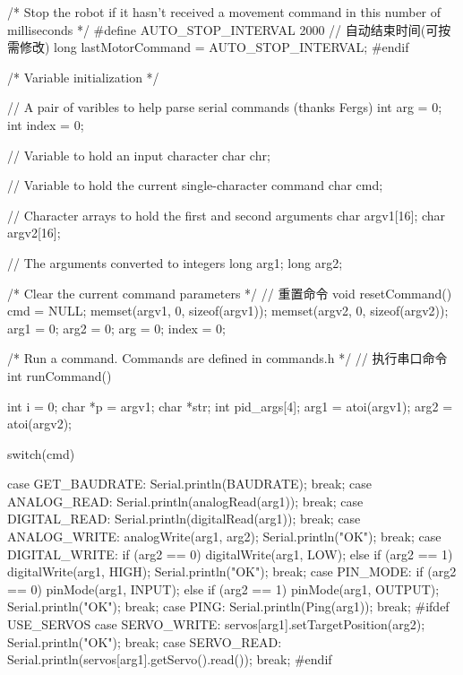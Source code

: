 \documentclass[openany, fontset=windowsold]{ctexbook}
\theoremstyle{kaiti}
\theoremstyle{normal}
\begin{document}
\begin{cpp}
    /* Stop the robot if it hasn't received a movement command
    in this number of milliseconds */
    #define AUTO_STOP_INTERVAL 2000 // 自动结束时间(可按需修改)
    long lastMotorCommand = AUTO_STOP_INTERVAL;
  #endif

  /* Variable initialization */

  // A pair of varibles to help parse serial commands (thanks Fergs)
  int arg = 0;
  int index = 0;

  // Variable to hold an input character
  char chr;

  // Variable to hold the current single-character command
  char cmd;

  // Character arrays to hold the first and second arguments
  char argv1[16];
  char argv2[16];

  // The arguments converted to integers
  long arg1;
  long arg2;

  /* Clear the current command parameters */
  // 重置命令
  void resetCommand() {
    cmd = NULL;
    memset(argv1, 0, sizeof(argv1));
    memset(argv2, 0, sizeof(argv2));
    arg1 = 0;
    arg2 = 0;
    arg = 0;
    index = 0;
  }

  /* Run a command.  Commands are defined in commands.h */
  // 执行串口命令
  int runCommand() {
    int i = 0;
    char *p = argv1;
    char *str;
    int pid_args[4];
    arg1 = atoi(argv1);
    arg2 = atoi(argv2);

    switch(cmd) {
    case GET_BAUDRATE:
      Serial.println(BAUDRATE);
      break;
    case ANALOG_READ:
      Serial.println(analogRead(arg1));
      break;
    case DIGITAL_READ:
      Serial.println(digitalRead(arg1));
      break;
    case ANALOG_WRITE:
      analogWrite(arg1, arg2);
      Serial.println("OK"); 
      break;
    case DIGITAL_WRITE:
      if (arg2 == 0) digitalWrite(arg1, LOW);
      else if (arg2 == 1) digitalWrite(arg1, HIGH);
      Serial.println("OK"); 
      break;
    case PIN_MODE:
      if (arg2 == 0) pinMode(arg1, INPUT);
      else if (arg2 == 1) pinMode(arg1, OUTPUT);
      Serial.println("OK");
      break;
    case PING:
      Serial.println(Ping(arg1));
      break;
  #ifdef USE_SERVOS
    case SERVO_WRITE:
      servos[arg1].setTargetPosition(arg2);
      Serial.println("OK");
      break;
    case SERVO_READ:
      Serial.println(servos[arg1].getServo().read());
      break;
  #endif

}}
\end{cpp}
\end{document}
